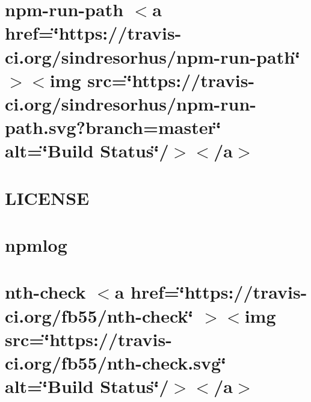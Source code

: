 \documentclass[twoside]{book}
\newcommand{\+}{\discretionary{\mbox{\scriptsize$\hookleftarrow$}}{}{}}
\begin{document}
\chapter{npm-\/run-\/path \texorpdfstring{$<$}{<}a href=\char`\"{}https\+://travis-\/ci.\+org/sindresorhus/npm-\/run-\/path\char`\"{} \texorpdfstring{$>$}{>}\texorpdfstring{$<$}{<}img src=\char`\"{}https\+://travis-\/ci.\+org/sindresorhus/npm-\/run-\/path.\+svg?branch=master\char`\"{} alt=\char`\"{}\+Build Status\char`\"{}/\texorpdfstring{$>$}{>}\texorpdfstring{$<$}{<}/a\texorpdfstring{$>$}{>}}
\label{md__c___users_vaishnavi_jadhav__desktop__developer_code_mean_stack_example_client_node_modules_npm_run_path_readme}

\chapter{LICENSE}
\label{md__c___users_vaishnavi_jadhav__desktop__developer_code_mean_stack_example_client_node_modules_npmlog__l_i_c_e_n_s_e}

\chapter{npmlog}
\label{md__c___users_vaishnavi_jadhav__desktop__developer_code_mean_stack_example_client_node_modules_npmlog__r_e_a_d_m_e}

\chapter{nth-\/check \texorpdfstring{$<$}{<}a href=\char`\"{}https\+://travis-\/ci.\+org/fb55/nth-\/check\char`\"{} \texorpdfstring{$>$}{>}\texorpdfstring{$<$}{<}img src=\char`\"{}https\+://travis-\/ci.\+org/fb55/nth-\/check.\+svg\char`\"{} alt=\char`\"{}\+Build Status\char`\"{}/\texorpdfstring{$>$}{>}\texorpdfstring{$<$}{<}/a\texorpdfstring{$>$}{>}}
\label{md__c___users_vaishnavi_jadhav__desktop__developer_code_mean_stack_example_client_node_modules_nth_check__r_e_a_d_m_e}

\end{document}
